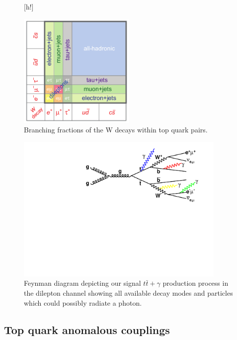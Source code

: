 \begin{figure} \label{fig-ttbarDecay}[h!]
\begin{center}
\includegraphics[width=0.5\textwidth]{Figures/ttbarDecayFractions.png}
\caption{Branching fractions of the W decays within top quark pairs. \cite{ttbarDecayFractions}}
\end{center}
\end{figure}

\begin{figure} \label{fig-ttgammaFeynmanDiagram}
\begin{center}
\includegraphics[width=0.9\textwidth]{Figures/ttgammaFeynmanDiagram.pdf}
\caption{Feynman diagram depicting our signal $t\bar{t}+\gamma$ production process in the dilepton channel showing all available decay modes and particles which could possibly radiate a photon.}
\end{center}
\end{figure}

\subsection{Top quark anomalous couplings}

